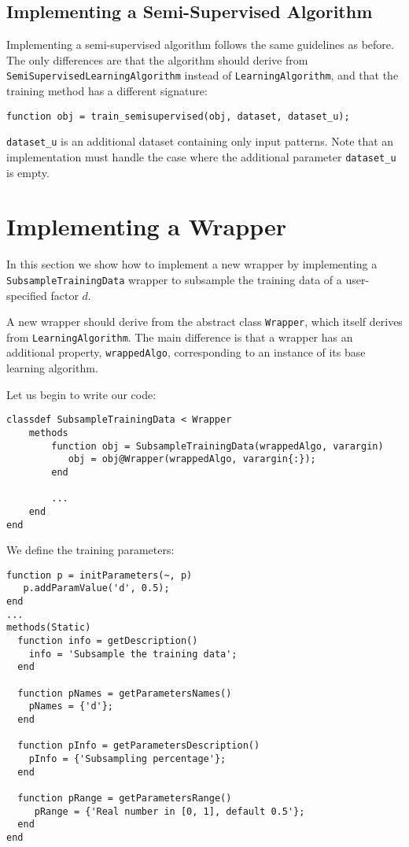 \subsection{Implementing a Semi-Supervised Algorithm}

Implementing a semi-supervised algorithm follows the same guidelines as before. The only differences are that the algorithm should derive from \verb|SemiSupervisedLearningAlgorithm| instead of \verb|LearningAlgorithm|, and that the training method has a different signature:

\begin{lstlisting}
function obj = train_semisupervised(obj, dataset, dataset_u);
\end{lstlisting}

\noindent \verb|dataset_u| is an additional dataset containing only input patterns. Note that an implementation must handle the case where the additional parameter \verb|dataset_u| is empty.

\section{Implementing a Wrapper}

In this section we show how to implement a new wrapper by implementing a \verb|SubsampleTrainingData| wrapper to subsample the training data of a  user-specified factor $d$.

A new wrapper should derive from the abstract class \verb|Wrapper|, which itself derives from \verb|LearningAlgorithm|. The main difference is that a wrapper has an additional property, \verb|wrappedAlgo|, corresponding to an instance of its base learning algorithm.

Let us begin to write our code:


\begin{lstlisting}
classdef SubsampleTrainingData < Wrapper
	methods
		function obj = SubsampleTrainingData(wrappedAlgo, varargin)
		   obj = obj@Wrapper(wrappedAlgo, varargin{:});
		end
		
		...
	end
end
\end{lstlisting}

\noindent We define the training parameters:

\begin{lstlisting}
function p = initParameters(~, p)
   p.addParamValue('d', 0.5);
end
...
methods(Static)
  function info = getDescription()
    info = 'Subsample the training data';
  end
        
  function pNames = getParametersNames()
    pNames = {'d'}; 
  end
        
  function pInfo = getParametersDescription()
    pInfo = {'Subsampling percentage'};
  end
        
  function pRange = getParametersRange()
     pRange = {'Real number in [0, 1], default 0.5'};
  end 
end
\end{lstlisting}

